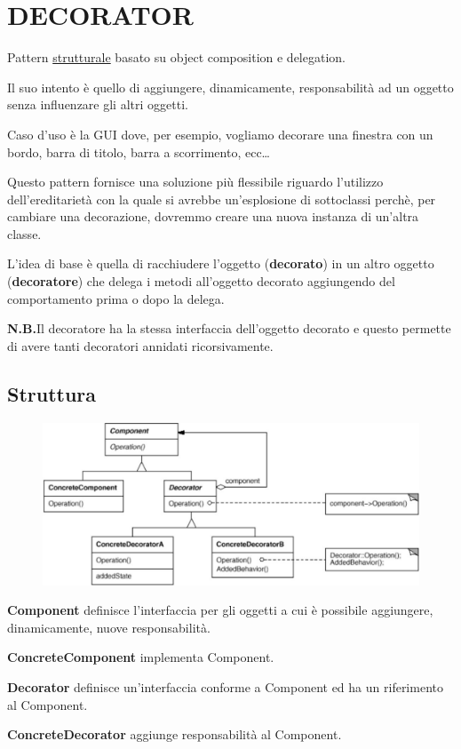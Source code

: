 \chapter{DECORATOR}

Pattern \underline{strutturale} basato su object composition e delegation.

Il suo intento è quello di aggiungere,  dinamicamente, responsabilità ad un oggetto senza influenzare gli altri oggetti. 

Caso d'uso è la GUI dove, per esempio, vogliamo decorare una finestra con un bordo, barra di titolo, barra a scorrimento, ecc\dots

Questo pattern fornisce una soluzione più flessibile riguardo l'utilizzo dell'ereditarietà con la quale si avrebbe un'esplosione di sottoclassi perchè, per cambiare 
una decorazione, dovremmo creare una nuova instanza di un'altra classe.

L'idea di base è quella di racchiudere l'oggetto (\textbf{decorato}) in un altro oggetto (\textbf{decoratore}) che delega i metodi all'oggetto decorato aggiungendo del 
comportamento prima o dopo la delega.

\medskip
\textbf{N.B.}Il decoratore ha la stessa interfaccia dell'oggetto decorato e questo permette di avere tanti decoratori annidati ricorsivamente.

\section{Struttura}

\begin{figure}[H]
    \centering
    \includegraphics[width=0.5\linewidth]{../../immagini/decorator/struttura_decorator}    
\end{figure}

\textbf{Component} definisce l'interfaccia per gli oggetti a cui è possibile aggiungere, dinamicamente, nuove responsabilità.

\textbf{ConcreteComponent} implementa Component.

\textbf{Decorator} definisce un'interfaccia conforme a Component ed ha un riferimento al Component.

\textbf{ConcreteDecorator} aggiunge responsabilità al Component.
\medskip

